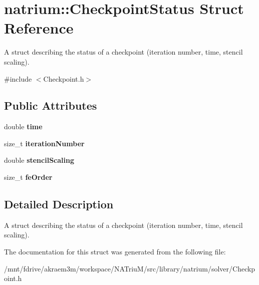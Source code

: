 \hypertarget{structnatrium_1_1CheckpointStatus}{
\section{natrium::CheckpointStatus Struct Reference}
\label{structnatrium_1_1CheckpointStatus}
}


A struct describing the status of a checkpoint (iteration number, time, stencil scaling).  


{\ttfamily \#include $<$Checkpoint.h$>$}\subsection*{Public Attributes}
\begin{DoxyCompactItemize}
\item 
\hypertarget{structnatrium_1_1CheckpointStatus_add611ef5de19fbe01990fd5fabf855e0}{
double {\bfseries time}}
\label{structnatrium_1_1CheckpointStatus_add611ef5de19fbe01990fd5fabf855e0}

\item 
\hypertarget{structnatrium_1_1CheckpointStatus_ac8a23227bdb13573d304582d7db9e6f2}{
size\_\-t {\bfseries iterationNumber}}
\label{structnatrium_1_1CheckpointStatus_ac8a23227bdb13573d304582d7db9e6f2}

\item 
\hypertarget{structnatrium_1_1CheckpointStatus_af4691a7ffd4070ea987742c5837ba7b0}{
double {\bfseries stencilScaling}}
\label{structnatrium_1_1CheckpointStatus_af4691a7ffd4070ea987742c5837ba7b0}

\item 
\hypertarget{structnatrium_1_1CheckpointStatus_a5fd25fdb804d466d7e985dd2197b5c12}{
size\_\-t {\bfseries feOrder}}
\label{structnatrium_1_1CheckpointStatus_a5fd25fdb804d466d7e985dd2197b5c12}

\end{DoxyCompactItemize}


\subsection{Detailed Description}
A struct describing the status of a checkpoint (iteration number, time, stencil scaling). 

The documentation for this struct was generated from the following file:\begin{DoxyCompactItemize}
\item 
/mnt/fdrive/akraem3m/workspace/NATriuM/src/library/natrium/solver/Checkpoint.h\end{DoxyCompactItemize}
